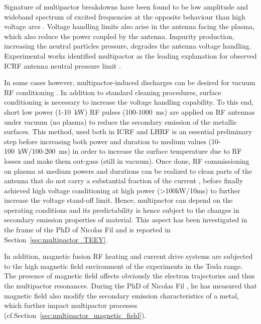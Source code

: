 
Signature of multipactor breakdowns have been found to be low amplitude and wideband spectrum of excited frequencies at the opposite behaviour than high voltage arcs \cite{dinca2009}. Voltage handling limits also arise in the antenna facing the plasma, which also reduce the power coupled by the antenna. Impurity production, increasing the neutral particles pressure, degrades the antenna voltage handling. Experimental works identified multipactor as the leading explanation for observed ICRF antenna neutral pressure limit \cite{graves2006}.

In some cases however, multipactor-induced discharges can be desired for vacuum RF conditioning . In addition to standard cleaning procedures, surface conditioning is necessary to increase the voltage handling capability. To this end, short low power (1-10~kW) RF pulses (100-1000~ms) are applied on RF antennas under vacuum (no plasma) to reduce the secondary emission of the metallic surfaces. This method, used both in ICRF  and LHRF  is an essential preliminary step before increasing both power and duration to medium values (10-100~kW/100-200~ms) in order to increase the surface temperature due to RF losses and make them out-gass (still in vacuum). Once done, RF commissioning on plasma at medium powers and durations can be realized to clean parts of the antenna that do not carry a substantial fraction of the current , before finally achieved high voltage conditioning at high power (>100kW/10ms) to further increase the voltage stand-off limit. Hence, multipactor can depend on the operating conditions and its predictability is hence subject to the changes  in secondary emission properties of material. This aspect has been investigated in the frame of the PhD of Nicolas Fil and is reported in Section~\ref{sec:multipactor_TEEY}.

In addition, magnetic fusion RF heating and current drive systems are subjected to the high magnetic field environment of the experiments in the Tesla range. The presence of magnetic field affects obviously the electron trajectories and thus the multipactor resonances. During the PhD of Nicolas Fil , he has measured that magnetic field also modify the secondary emission characteristics of a metal, which further impact multipactor processes (cf.Section~\ref{sec:multipactor_magnetic_field}). 

